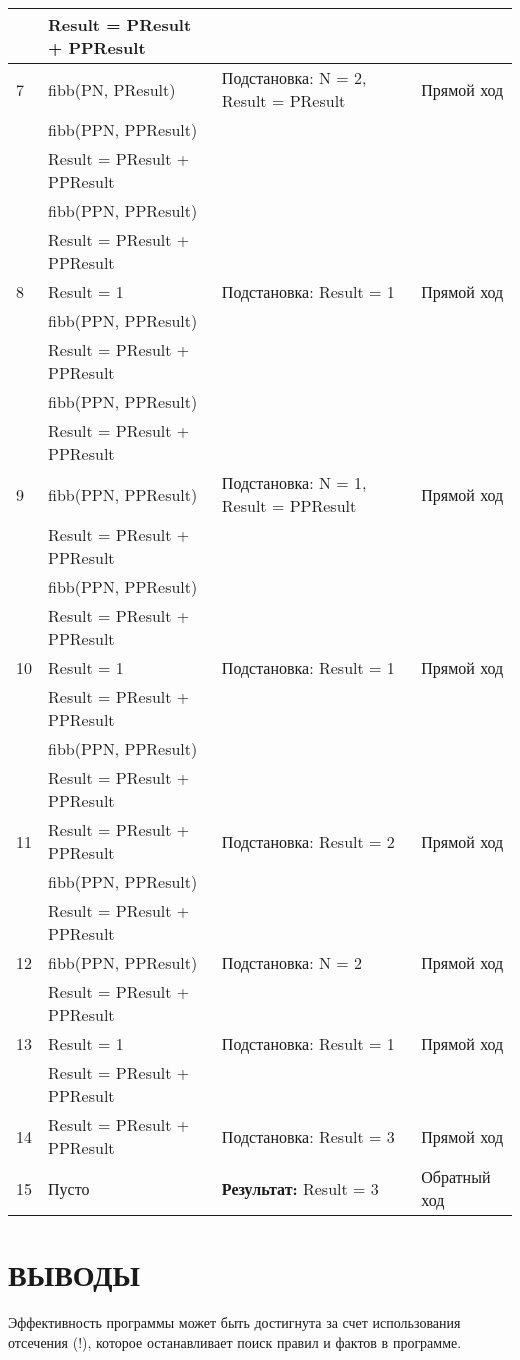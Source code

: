 {\begin{longtable}{|p{1.15cm}|p{4cm}|p{6cm}|p{6cm}|}
      & Result = PResult + PPResult & & \\
    \hline
    7 & fibb(PN, PResult) & Подстановка: N = 2, Result = PResult & Прямой ход \\
      & fibb(PPN, PPResult) & & \\
      & Result = PResult + PPResult & & \\
      & fibb(PPN, PPResult) & & \\
      & Result = PResult + PPResult & & \\
    \hline
    8 & Result = 1 & Подстановка: Result = 1 & Прямой ход \\
      & fibb(PPN, PPResult) & & \\
      & Result = PResult + PPResult & & \\
      & fibb(PPN, PPResult) & & \\
      & Result = PResult + PPResult & & \\
    \hline
    9 & fibb(PPN, PPResult) & Подстановка: N = 1, Result = PPResult & Прямой ход \\
      & Result = PResult + PPResult & & \\
      & fibb(PPN, PPResult) & & \\
      & Result = PResult + PPResult & & \\
    \hline
    10 & Result = 1 & Подстановка: Result = 1 & Прямой ход \\
       & Result = PResult + PPResult & & \\
       & fibb(PPN, PPResult) & & \\
       & Result = PResult + PPResult & & \\
    \hline
    11 & Result = PResult + PPResult & Подстановка: Result = 2 & Прямой ход \\
       & fibb(PPN, PPResult) & & \\
       & Result = PResult + PPResult & & \\
    \hline
    12 & fibb(PPN, PPResult) & Подстановка: N = 2 & Прямой ход \\
       & Result = PResult + PPResult & & \\
    \hline
    13 & Result = 1 & Подстановка: Result = 1 & Прямой ход \\
       & Result = PResult + PPResult & & \\
    \hline
    14 & Result = PResult + PPResult & Подстановка: Result = 3 & Прямой ход \\
    \hline
    15 & Пусто & \textbf{Результат:} Result = 3 & Обратный ход \\
    \hline
\end{longtable}
}

\section{ВЫВОДЫ}

Эффективность программы может быть достигнута за счет использования отсечения (!), которое останавливает поиск правил и фактов в программе.
